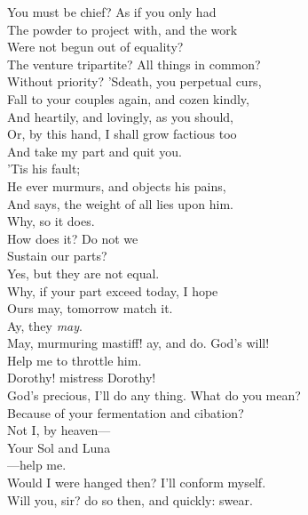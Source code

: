 \documentclass[a4paper,oneside,12pt]{memoir}
\begin{document}
\begin{drama*}
You must be chief? As if you only had\\
The powder to project with, and the work\\
Were not begun out of equality?\\
The venture tripartite? All things in common?\\
Without priority? 'Sdeath, you perpetual curs,\\
Fall to your couples again, and cozen kindly,\\
And heartily, and lovingly, as you should,\\
Or, by this hand, I shall grow factious too\\
And take my part and quit you.\\
\facespeaks {} 'Tis his fault;\\
He ever murmurs, and objects his pains,\\
And says, the weight of all lies upon him.\\
\subtlespeaks Why, so it does.\\
\dolspeaks {} How does it? Do not we\\
Sustain our parts?\\
\subtlespeaks {} Yes, but they are not equal.\\
\dolspeaks Why, if your part exceed today, I hope\\
Ours may, tomorrow match it.\\
\subtlespeaks {} Ay, they \emph{may}.\\
\dolspeaks May, murmuring mastiff! ay, and do. God's will!\\
Help me to throttle him.\\
\subtlespeaks {} Dorothy! mistress Dorothy!\\
God's precious, I'll do any thing. What do you mean?\\
\dolspeaks Because of your fermentation and cibation?\\
\subtlespeaks Not I, by heaven---\\
\dolspeaks {} Your Sol and Luna\\
 ---help me.\\
\subtlespeaks Would I were hanged then? I'll conform myself.\\
\dolspeaks Will you, sir? do so then, and quickly: swear.\\

\end{drama*}
\end{document}
